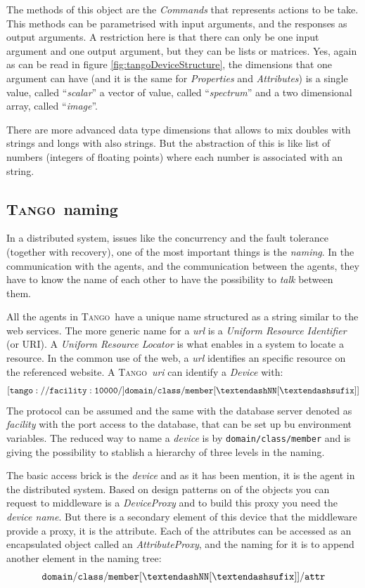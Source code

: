 \documentclass[10pt,a4paper,twoside]{llncs}
\newcommand{\tango}{\textsc{Tango}}
\begin{document}
The methods of this object are the \emph{Commands} that represents actions to be take. This methods can be parametrised with input arguments, and the responses as output arguments. A restriction here is that there can only be one input argument and one output argument, but they can be lists or matrices. Yes, again as can be read in figure \ref{fig:tangoDeviceStructure}, the dimensions that one argument can have (and it is the same for \emph{Properties} and \emph{Attributes}) is a single value, called ``\emph{scalar}'' a vector of value, called ``\emph{spectrum}'' and a two dimensional array, called ``\emph{image}''.

There are more advanced data type dimensions that allows to mix doubles with strings and longs with also strings. But the abstraction of this is like list of numbers (integers of floating points) where each number is associated with an string. 

\subsection{\tango\, naming}

In a distributed system, issues like the concurrency and the fault tolerance (together with recovery), one of the most important things is the \emph{naming}. In the communication with the agents, and the communication between the agents, they have to know the name of each other to have the possibility to \emph{talk} between them.

All the agents in \tango\, have a unique name structured as a string similar to the web services. The more generic name for a \emph{url} is a \emph{Uniform Resource Identifier} (or URI). A \emph{Uniform Resource Locator} is what enables in a system to locate a resource. In the common use of the web, a \emph{url} identifies an specific resource on the referenced website. A \tango\, \emph{uri} can identify a \emph{Device} with:
\begin{equation}
    {\tt [tango://facility:10000/]domain/class/member[\textendash NN[\textendash sufix]]}\label{eq:tangoDeviceFullName}
\end{equation}
The protocol can be assumed and the same with the database server denoted as \emph{facility} with the port access to the database, that can be set up bu environment variables. The reduced way to name a \emph{device} is by {\tt domain/class/member} and is giving the possibility to stablish a hierarchy of three levels in the naming.

The basic access brick is the \emph{device} and as it has been mention, it is the agent in the distributed system. Based on design patterns on of the objects you can request to middleware is a \emph{DeviceProxy} and to build this proxy you need the \emph{device name}. But there is a secondary element of this device that the middleware provide a proxy, it is the attribute. Each of the attributes can be accessed as an encapsulated object called an \emph{AttributeProxy}, and the naming for it is to append another element in the naming tree:
\begin{equation}
    {\tt domain/class/member[\textendash NN[\textendash sufix]]/attr}\label{eq:tangoAttrName}
\end{equation}
\end{document}
